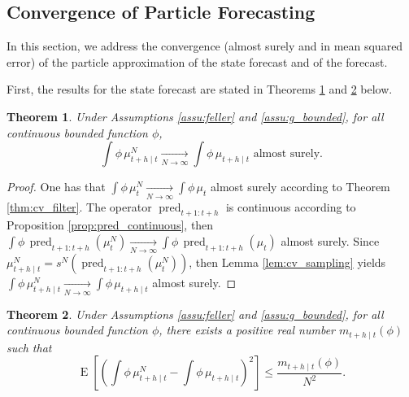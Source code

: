 \documentclass{article}
\newtheorem{thm}{Theorem}
\newcommand{\limN}{\underset{N \rightarrow \infty}{\longrightarrow}}
\DeclareMathOperator{\E}{E}
\DeclareMathOperator{\pred}{pred}
\begin{document}
\subsection{Convergence of Particle Forecasting}

In this section, we address the convergence (almost surely and in mean squared error) of the particle approximation of the state forecast and of the forecast.

First, the results for the state forecast are stated in Theorems \ref{thm:cv_state_forecast} and \ref{thm:cv_state_forecast_l2} below.

\begin{thm}\label{thm:cv_state_forecast}
    Under Assumptions \ref{assu:feller} and \ref{assu:g_bounded}, for all continuous bounded function $\phi$,
    $$\int \phi \, \mu^N_{t+h \mid t} \limN \int \phi \, \mu_{t+h \mid t} \text{\ \ almost surely.}$$
\end{thm}

\begin{proof}
    One has that $\displaystyle \int \phi \, \mu^N_t \limN \int \phi \, \mu_t$ almost surely according to Theorem \ref{thm:cv_filter}. The operator $\pred_{t+1:t+h}$ is continuous according to Proposition \ref{prop:pred_continuous}, then $\displaystyle \int \phi \, \pred_{t+1:t+h}(\mu^N_t) \limN \int \phi \, \pred_{t+1:t+h} (\mu_t)$ almost surely. Since $\mu^N_{t+h \mid t} = s^N (\pred_{t+1:t+h} (\mu^N_t))$, then Lemma \ref{lem:cv_sampling} yields $\displaystyle \int \phi \, \mu^N_{t+h \mid t} \limN \int \phi \, \mu_{t+h \mid t}$ almost surely.
\end{proof}

\begin{thm}\label{thm:cv_state_forecast_l2}
  Under Assumptions \ref{assu:feller} and \ref{assu:g_bounded}, for all continuous bounded function $\phi$, there exists a positive real number $m_{t+h \mid t}(\phi)$ such that
  $$\E[(\int \phi \, \mu^N_{t+h \mid t} - \int \phi \, \mu_{t+h \mid t})^2] \leq \frac{m_{t+h \mid t}(\phi)}{N^2}.$$
\end{thm}
\end{document}
